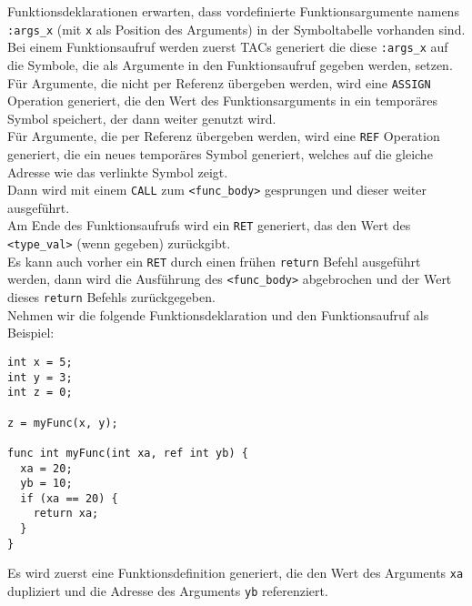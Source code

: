 Funktionsdeklarationen erwarten, dass vordefinierte Funktionsargumente namens \texttt{:args\_x} (mit \texttt{x} als Position des Arguments) in der Symboltabelle vorhanden sind.
Bei einem Funktionsaufruf werden zuerst \acp{TAC} generiert die diese \texttt{:args\_x} auf die Symbole, die als Argumente in den Funktionsaufruf gegeben werden, setzen.
Für Argumente, die nicht per Referenz übergeben werden, wird eine \texttt{ASSIGN} Operation generiert, die den Wert des Funktionsarguments in ein temporäres Symbol speichert, der dann weiter genutzt wird.\\
Für Argumente, die per Referenz übergeben werden, wird eine \texttt{REF} Operation generiert, die ein neues temporäres Symbol generiert, welches auf die gleiche Adresse wie das verlinkte Symbol zeigt.\\
Dann wird mit einem \texttt{CALL} zum \texttt{<func\_body>} gesprungen und dieser weiter ausgeführt.\\
Am Ende des Funktionsaufrufs wird ein \texttt{RET} generiert, das den Wert des \texttt{<type\_val>} (wenn gegeben) zurückgibt.\\
Es kann auch vorher ein \texttt{RET} durch einen frühen \texttt{return} Befehl ausgeführt werden, dann wird die Ausführung des \texttt{<func\_body>} abgebrochen und der Wert dieses \texttt{return} Befehls zurückgegeben.\\

Nehmen wir die folgende Funktionsdeklaration und den Funktionsaufruf als Beispiel:

\begin{lstlisting}[caption={Beispiel Funktionsdeklaration und Funktionsaufruf}]
int x = 5;
int y = 3;
int z = 0;

z = myFunc(x, y);

func int myFunc(int xa, ref int yb) {
  xa = 20;
  yb = 10;
  if (xa == 20) {
    return xa;
  }
}
\end{lstlisting}

Es wird zuerst eine Funktionsdefinition generiert, die den Wert des Arguments \texttt{xa} dupliziert und die Adresse des Arguments \texttt{yb} referenziert.

